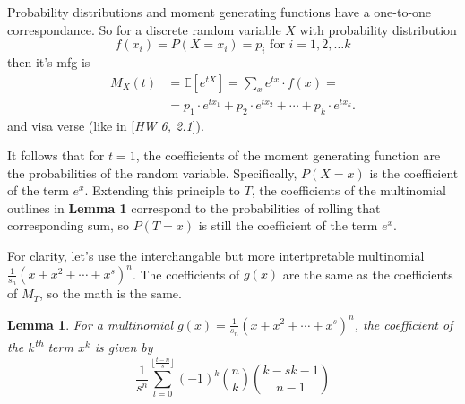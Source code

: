 \documentclass[a4paper]{article}
\newtheorem{lemma}{Lemma}
\begin{document}
Probability distributions and moment generating functions have a one-to-one correspondance. So for a discrete random variable $X$ with probability distribution
%
$$ 
f(x_i) = P(X = x_i) = p_i \text{ for } i = 1, 2, \ldots k 
$$
%
then it's mfg is
%
\begin{align*}
    M_X(t) &= \mathbb{E}[e^{tX}] = \sum_{x} e^{tx} \cdot f(x) =  \\ 
    &= p_1 \cdot e^{tx_1} + p_2 \cdot e^{tx_2} + \cdots + p_k \cdot e^{tx_k}.
\end{align*}
%
and visa verse (like in [\textit{HW 6, 2.1}]).

It follows that for $t = 1$, the coefficients of the moment generating function are the probabilities of the random variable. Specifically, $P(X = x)$ is the coefficient of the term $e^x$. Extending this principle to $T$, the coefficients of the multinomial outlines in \textbf{Lemma 1} correspond to the probabilities of rolling that corresponding sum, so $P(T = x)$ is still the coefficient of the term $e^x$.

For clarity, let's use the interchangable but more intertpretable multinomial $\frac{1}{s_n}(x + x^2 + \cdots + x^s)^n$. The coefficients of $g(x)$ are the same as the coefficients of $M_T$, so the math is the same.


\begin{lemma}
    For a multinomial $g(x) = \frac{1}{s_n}(x + x^2 + \cdots + x^s)^n$, the coefficient of the $k$\textsuperscript{th} term $x^k$ is given by
    $$ \frac{1}{s^n} \sum_{l = 0}^{\lfloor\frac{t-n}{s} \rfloor} (-1)^k \binom{n}{k} \binom{k-sk-1}{n-1} $$
\end{lemma}

\end{document}
